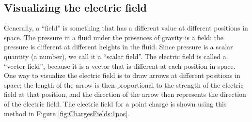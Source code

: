 \subsection{Visualizing the electric field}
Generally, a ``field'' is something that has a different value at different positions in space. The pressure in a fluid under the presences of gravity is a field: the pressure is different at different heights in the fluid. Since pressure is a scalar quantity (a number), we call it a ``scalar field''. The electric field is called a ``vector field'', because it is a vector that is different at each position in space. One way to visualize the electric field is to draw arrows at different positions in space; the length of the arrow is then proportional to the strength of the electric field at that position, and the direction of the arrow then represents the direction of the electric field. The electric field for a point charge is shown using this method in Figure \ref{fig:ChargesFields:1pos}.

